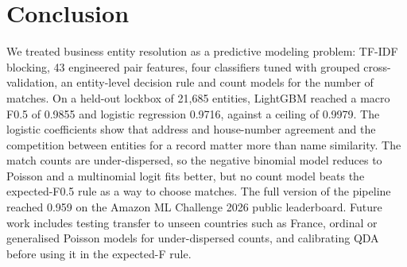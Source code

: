 

\section{Conclusion}
We treated business entity resolution as a predictive modeling problem: TF-IDF blocking, 43 engineered pair
features, four classifiers tuned with grouped cross-validation, an entity-level decision rule and count models for
the number of matches. On a held-out lockbox of 21,685 entities, LightGBM reached a macro F0.5 of 0.9855 and logistic
regression 0.9716, against a ceiling of 0.9979. The logistic coefficients show that address and house-number
agreement and the competition between entities for a record matter more than name similarity. The match counts are
under-dispersed, so the negative binomial model reduces to Poisson and a multinomial logit fits better, but no count
model beats the expected-F0.5 rule as a way to choose matches. The full version of the pipeline reached 0.959 on the
Amazon ML Challenge 2026 public leaderboard. Future work includes testing transfer to unseen countries such as
France, ordinal or generalised Poisson models for under-dispersed counts, and calibrating QDA before using it in the
expected-F rule.
